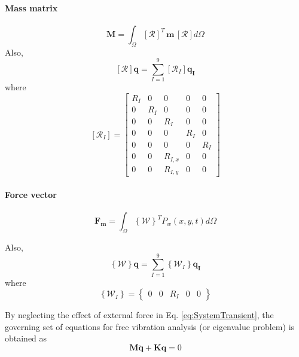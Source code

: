 \documentclass[3p,preprint,12pt]{elsarticle}
\begin{document}
\paragraph* {\textbf{Mass matrix}}
\begin{equation*}
\boldsymbol{M} =\int_{\Omega} \left[ \mathcal{R} \right]^{T} \, \boldsymbol{m} \, \left[  \mathcal{R} \right] d\Omega
\end{equation*}
Also, 
\begin{equation*}
\left[  \mathcal{R} \right] \boldsymbol{q} = \sum_{I=1}^{9} \left[  \mathcal{R}_{I} \right] \boldsymbol{q_{I}}
\end{equation*}
where
\begin{equation*}
\left[  \mathcal{R}_{I} \right]=\left[\begin{array}{ccccc}
R_{I} & 0 & 0 & 0 & 0\\
0 & R_{I} & 0 & 0 & 0\\
0 & 0 & R_{I} & 0 & 0\\
0 & 0 & 0 & R_{I} & 0\\
0 & 0 & 0 & 0 & R_{I}\\
0 & 0 & R_{I,x} & 0 & 0\\
0 & 0 & R_{I,y} & 0 & 0
\end{array}\right]
\end{equation*}

\paragraph* {\textbf{Force vector}}
\begin{equation*}
\boldsymbol{F_{m}}=\int_{\Omega} \left\{ \mathcal{W} \right\}^{T}P_{w}\left(x, y, t\right)d\Omega
\end{equation*}

Also,
\begin{equation*}
\left\{ \mathcal{W} \right\} \boldsymbol{q} = \sum_{I=1}^{9} \left\{ \mathcal{W}_{I} \right\} \boldsymbol{q_{I}}
\end{equation*}
where
\begin{equation*}
 \left\{ \mathcal{W}_{I} \right\}=\left\{\begin{array}{ccccc}
0 & 0 & R_{I} & 0 & 0\end{array}\right\}
\end{equation*}

By neglecting the effect of external force in Eq. \cref{eq:SystemTransient}, the governing set of equations for free vibration analysis (or eigenvalue problem) \cite{reddy2004mechanics} is obtained as
\begin{equation*}
\boldsymbol{M}\boldsymbol{\ddot{q}} + \boldsymbol{K}\boldsymbol{q} = 0
\end{equation*}
\end{document}
